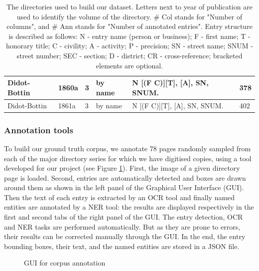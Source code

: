 \documentclass[runningheads,svgnames]{llncs}
\begin{document}
\begin{table}[h!]
{\begin{tabular}{|l|l|l|l|l|l|}
    \\ \hline
    Didot-Bottin & 1860a	& 3	& by name & N [(F \textbar C)][T], [A], SN, SNUM. & 378
    \\ \hline
    Didot-Bottin & 1861a	& 3	& by name & N [(F \textbar C)][T], [A], SN, SNUM. & 402
    \\ \hline
    \end{tabular}%
    }
    \caption{The directories used to build our dataset. Letters next to year of publication are used to identify the volume of the directory. \# Col stands for "Number of columns", and \# Ann stands for "Number of annotated entries". Entry structure is described as follows: N - entry name (person or business); F - first name; T - honorary title; C - civility; A - activity; P - precision; SN - street name; SNUM - street number; SEC - section; D - district; CR - cross-reference; bracketed elements are optional.}
    \label{tab:directories}
    \end{table}
    
\subsubsection{Annotation tools}
To build our ground truth corpus, we annotate 78 pages randomly sampled from each of the major directory series for which we have digitised copies, using a tool developed for our project (see Figure \ref{fig:annotator}). First, the image of a given directory page is loaded. Second, entries are automatically detected and boxes are drawn around them as shown in the left panel of the Graphical User Interface (GUI). Then the text of each entry is extracted by an OCR tool and finally named entities are annotated by a NER tool: the results are displayed respectively in the first and second tabs of the right panel of the GUI. The entry detection, OCR and NER tasks are performed automatically. But as they are prone to errors, their results can be corrected manually through the GUI. In the end, the entry bounding boxes, their text, and the named entities are stored in a JSON file.

\begin{figure}[htb!]
	  \caption{\label{fig:annotator} GUI for corpus annotation}
\end{figure}
\end{document}
